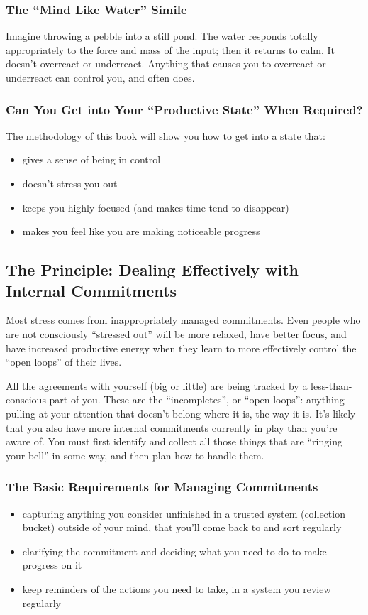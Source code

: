 \documentclass[letterpaper]{article}
\newcommand{\p}{\vspace{1em}\par}		%
\begin{document}
\subsubsection*{The ``Mind Like Water'' Simile}
Imagine throwing a pebble into a still pond. The water responds totally appropriately to the force and mass of the input; then it returns to calm. It doesn't overreact or underreact. Anything that causes you to overreact or underreact can control you, and often does.

\subsubsection*{Can You Get into Your ``Productive State'' When Required?}
The methodology of this book will show you how to get into a state that:
\begin{itemize}
\item gives a sense of being in control
\item doesn't stress you out
\item keeps you highly focused (and makes time tend to disappear)
\item makes you feel like you are making noticeable progress
\end{itemize}

\subsection{The Principle: Dealing Effectively with Internal Commitments}
Most stress comes from inappropriately managed commitments. Even people who are not consciously ``stressed out'' will be more relaxed, have better focus, and have increased productive energy when they learn to more effectively control the ``open loops'' of their lives.

\p All the agreements with yourself (big or little) are being tracked by a less-than-conscious part of you. These are the ``incompletes'', or ``open loops'': anything pulling at your attention that doesn't belong where it is, the way it is. It's likely that you also have more internal commitments currently in play than you're aware of. You must first identify and collect all those things that are ``ringing your bell'' in some way, and then plan how to handle them.

\subsubsection*{The Basic Requirements for Managing Commitments}
\begin{itemize}
\item capturing anything you consider unfinished in a trusted system (collection bucket) outside of your mind, that you'll come back to and sort regularly
\item clarifying the commitment and deciding what you need to do to make progress on it
\item keep reminders of the actions you need to take, in a system you review regularly
\end{itemize}
\end{document}
